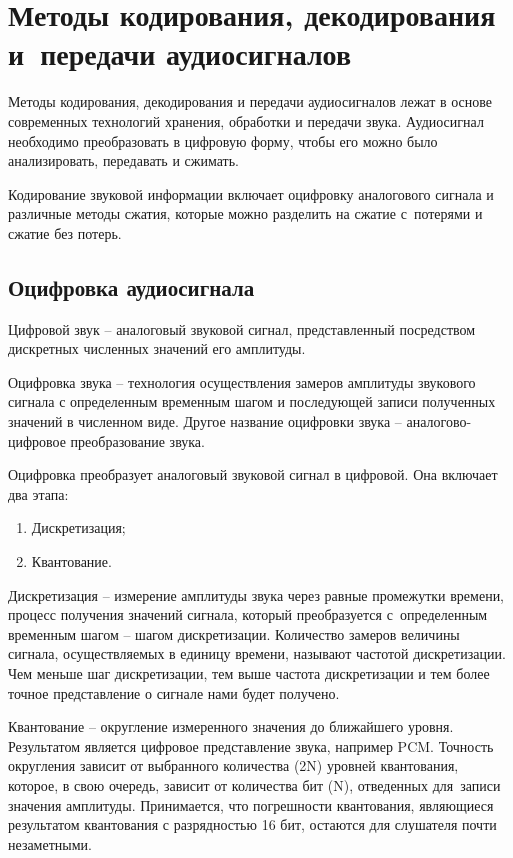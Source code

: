 \documentclass{ou}
\begin{document}
\section{Методы кодирования, декодирования и~передачи аудиосигналов}
Методы кодирования, декодирования и передачи аудиосигналов лежат в основе современных технологий хранения, обработки и передачи звука. Аудиосигнал необходимо преобразовать в цифровую форму, чтобы его можно было анализировать, передавать и сжимать. 

Кодирование звуковой информации включает оцифровку аналогового сигнала и различные методы сжатия, которые можно разделить на сжатие с~потерями и сжатие без потерь.
\subsection{Оцифровка аудиосигнала}
Цифровой звук -- аналоговый звуковой сигнал, представленный посредством дискретных численных значений его амплитуды.

Оцифровка звука -- технология осуществления замеров амплитуды звукового сигнала с определенным временным шагом и последующей записи полученных значений в численном виде. Другое название оцифровки звука -- аналогово-цифровое преобразование звука.

Оцифровка преобразует аналоговый звуковой сигнал в цифровой. Она включает два этапа:
\begin{enumerate}[leftmargin=0em, itemindent=3.75em, nosep, label=\arabic*)]
\item Дискретизация;
\item Квантование.
\end{enumerate}

Дискретизация -- измерение амплитуды звука через равные промежутки времени, процесс получения значений сигнала, который преобразуется с~определенным временным шагом -- шагом дискретизации. Количество замеров величины сигнала, осуществляемых в единицу времени, называют частотой дискретизации. Чем меньше шаг дискретизации, тем выше частота дискретизации и тем более точное представление о сигнале нами будет получено.

Квантование -- округление измеренного значения до ближайшего уровня. Результатом является цифровое представление звука, например PCM. Точность округления зависит от выбранного количества (2N) уровней квантования, которое, в свою очередь, зависит от количества бит (N), отведенных для~записи значения амплитуды. Принимается, что погрешности квантования, являющиеся результатом квантования с разрядностью 16 бит, остаются для слушателя почти незаметными.
\end{document}
